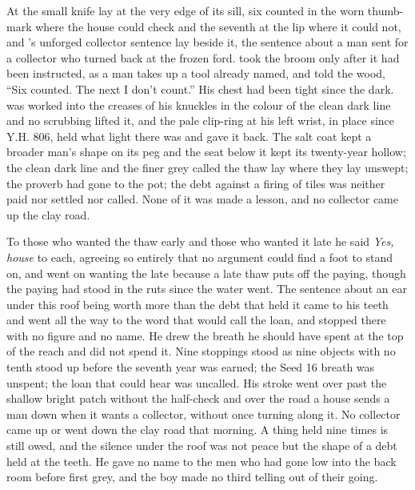 At  the small knife lay at the very edge of its sill, six counted in the worn thumb-mark where the house could check and the seventh at the lip where it could not, and 's unforged collector sentence lay beside it, the sentence about a man sent for a collector who turned back at the frozen ford.  took the broom only after it had been instructed, as a man takes up a tool already named, and told the wood, “Six counted. The next I don't count.” His chest had been tight since the dark.  was worked into the creases of his knuckles in the colour of the clean dark line and no scrubbing lifted it, and the pale clip-ring at his left wrist, in place since Y.H. 806, held what light there was and gave it back. The salt coat kept a broader man's shape on its peg and the seat below it kept its twenty-year hollow; the clean dark line and the finer grey called the thaw lay where they lay unswept; the proverb had gone to the pot; the debt against a firing of tiles was neither paid nor settled nor called. None of it was made a lesson, and no collector came up the clay road.

To those who wanted the thaw early and those who wanted it late he said \emph{Yes, house} to each, agreeing so entirely that no argument could find a foot to stand on, and went on wanting the late because a late thaw puts off the paying, though the paying had stood in the ruts since the water went. The sentence about an ear under this roof being worth more than the debt that held it came to his teeth and went all the way to the word that would call the loan, and stopped there with no figure and no name. He drew the breath he should have spent at the top of the reach and did not spend it. Nine stoppings stood as nine objects with no tenth stood up before the seventh year was earned; the Seed 16 breath was unspent; the loan that could hear was uncalled. His stroke went over  past the shallow bright patch without the half-check and over the road a house sends a man down when it wants a collector, without once turning along it. No collector came up or went down the clay road that morning. A thing held nine times is still owed, and the silence under the roof was not peace but the shape of a debt held at the teeth. He gave no name to the men who had gone low into the back room before first grey, and the boy made no third telling out of their going.

\scenebreak

